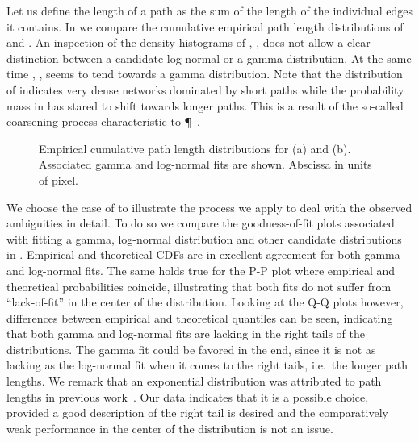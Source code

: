 		Let us define the length of a path as the sum of the length of the individual edges it contains. In  we compare the cumulative empirical path length distributions of  and . An inspection of the density histograms of , , does not allow a clear distinction between a candidate log-normal or a gamma distribution. At the same time , , seems to tend towards a gamma distribution. Note that the distribution of  indicates very dense networks dominated by short paths while the probability mass in  has stared to shift towards longer paths. This is a result of the so-called coarsening process characteristic to \P~\cite{baumgarten2010plasmodial}.

		\begin{figure}
			\centering

			\caption[Path length distributions.]{Empirical cumulative path length distributions for  (a) and  (b). Associated gamma and log-normal fits are shown. Abscissa in units of pixel.}
			\label{fig:path_lengths}
		\end{figure}

		We choose the case of  to illustrate the process we apply to deal with the observed ambiguities in detail. To do so we compare the goodness-of-fit plots associated with fitting a gamma, log-normal distribution and other candidate distributions in . Empirical and theoretical CDFs are in excellent agreement for both gamma and log-normal fits. The same holds true for the P-P plot where empirical and theoretical probabilities coincide, illustrating that both fits do not suffer from ``lack-of-fit'' in the center of the distribution. Looking at the Q-Q plots however, differences between empirical and theoretical quantiles can be seen, indicating that both gamma and log-normal fits are lacking in the right tails of the distributions. The gamma fit could be favored in the end, since it is not as lacking as the log-normal fit when it comes to the right tails, i.e.\ the longer path lengths. We remark that an exponential distribution was attributed to path lengths in previous work~\cite{baumgarten2010plasmodial}. Our data indicates that it is a possible choice, provided a good description of the right tail is desired and the comparatively weak performance in the center of the distribution is not an issue.

